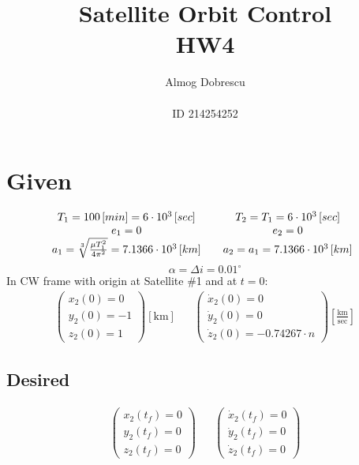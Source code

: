 \documentclass[11pt, a4paper]{article}
\title{Satellite Orbit Control \\ HW4}
\author{Almog Dobrescu\\\\ID 214254252}
\begin{document}
\maketitle

\thispagestyle{empty}
\newpage
\setcounter{page}{1}

\tableofcontents
\vfil
\listoffigures
\newpage

\section{Given}
\begin{equation*}
    \begin{matrix}
        T_1=100\left[min\right] = 6\cdot10^3\left[sec\right] && T_2 = T_1 = 6\cdot10^3\left[sec\right] \\
        e_1 = 0 && e_2 = 0 \\
        a_1 = \sqrt[3]{\frac{\mu T_1^2}{4\pi^2}} = 7.1366\cdot10^3\left[km\right] && a_2 = a_1 = 7.1366\cdot10^3\left[km\right]
    \end{matrix}\\
\end{equation*}
\begin{equation*}
    \alpha=\Delta i = 0.01^\circ
\end{equation*}
In CW frame with origin at Satellite \#1 and at $t=0$:
\begin{equation*}
    \begin{matrix}
    \begin{pmatrix}
        x_2(0)=0 \\ y_2(0)=-1 \\ z_2(0)=1
    \end{pmatrix}\left[\mathrm{km}\right] &&
    \begin{pmatrix}
        \dot{x}_2(0)=0 \\ \dot{y}_2(0) =0 \\ \dot{z}_2(0)=-0.74267\cdot n
    \end{pmatrix}\displaystyle\left[\frac{\mathrm{km}}{\mathrm{sec}}\right]
    \end{matrix}
\end{equation*}

\subsection{Desired}
\begin{equation*}
    \begin{matrix}
    \begin{pmatrix}
        x_2(t_f)=0 \\ y_2(t_f)=0 \\ z_2(t_f)=0
    \end{pmatrix} &&
    \begin{pmatrix}
        \dot{x}_2(t_f)=0 \\ \dot{y}_2(t_f)=0 \\ \dot{z}_2(t_f)=0
    \end{pmatrix}
    \end{matrix}
\end{equation*}
\end{document}
